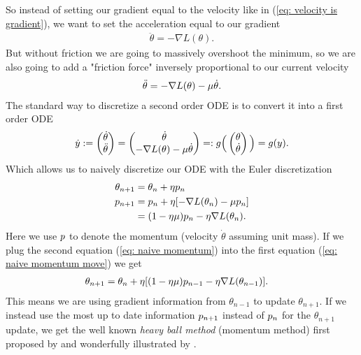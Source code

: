 So instead of setting our gradient equal to the velocity like in (\ref{eq:
velocity is gradient}), we want to set the acceleration equal to our gradient
%
\begin{align*}
	\ddot{\theta} = -\nabla L(\theta).
\end{align*}
%
But without friction we are going to massively overshoot the minimum, so we are
also going to add a "friction force" inversely proportional to our current
velocity
%
\begin{align}\label{eq: acceleration is gradient + friction}
	\ddot{\theta} = -\nabla L(\theta) - \mu \dot{\theta}.
\end{align}
%
The standard way to discretize a second order ODE is to convert it into a first
order ODE
%
\begin{align*}
	\dot{y} := \begin{pmatrix}
		\dot{\theta}\\
		\ddot{\theta}
	\end{pmatrix}
	= \begin{pmatrix}
		\dot{\theta} \\
		-\nabla L(\theta) - \mu \dot{\theta}
	\end{pmatrix}
	=: g\Big(\begin{pmatrix}
		\theta \\
		\dot{\theta}
	\end{pmatrix}\Big)
	= g(y).
\end{align*}
%
Which allows us to naively discretize our ODE with the Euler discretization
%
\begin{subequations}
\begin{align}
	\theta_{n+1} &= \theta_n + \eta p_n \label{eq: naive momentum move}\\
	p_{n+1} &= p_n + \eta [-\nabla L(\theta_n) - \mu p_n]
	\label{eq: naive momentum}\\ \nonumber
	&= (1-\eta\mu)p_n - \eta\nabla L(\theta_n).
\end{align}
\end{subequations}
%
Here we use \(p\) to denote the momentum (velocity \(\dot{\theta}\)
assuming unit mass).
If we plug the second equation (\ref{eq: naive momentum}) into the first
equation (\ref{eq: naive momentum move}) we get
%
\begin{align*}
	\theta_{n+1}
	&= \theta_n + \eta [(1-\eta\mu)p_{n-1} - \eta\nabla L(\theta_{n-1})].
\end{align*}
%
This means we are using gradient information from \(\theta_{n-1}\) to update
\(\theta_{n+1}\). If we instead use the most up to date information
\(p_{n+1}\) instead of \(p_n\) for the \(\theta_{n+1}\) update,
we get the well known \emph{heavy ball method} (momentum method) first proposed
by \textcite{polyakMethodsSpeedingConvergence1964} and wonderfully illustrated
by \textcite{gohWhyMomentumReally2017}.

